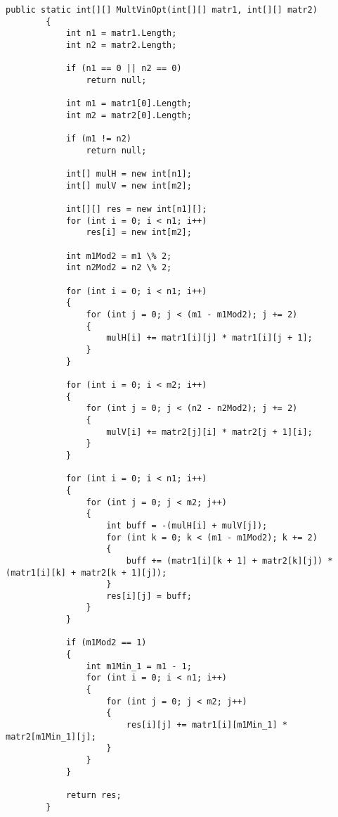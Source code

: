 \documentclass[12pt]{report}
\begin{document}
\begin{lstlisting}[label=some-code,caption=Оптимизированный алгоритм Винограда]
public static int[][] MultVinOpt(int[][] matr1, int[][] matr2)
        {
            int n1 = matr1.Length;
            int n2 = matr2.Length;

            if (n1 == 0 || n2 == 0)
                return null;

            int m1 = matr1[0].Length;
            int m2 = matr2[0].Length;

            if (m1 != n2)
                return null;

            int[] mulH = new int[n1];
            int[] mulV = new int[m2];

            int[][] res = new int[n1][];
            for (int i = 0; i < n1; i++)
                res[i] = new int[m2];

            int m1Mod2 = m1 \% 2;
            int n2Mod2 = n2 \% 2;

            for (int i = 0; i < n1; i++)
            {
                for (int j = 0; j < (m1 - m1Mod2); j += 2)
                {
                    mulH[i] += matr1[i][j] * matr1[i][j + 1];
                }
            }

            for (int i = 0; i < m2; i++)
            {
                for (int j = 0; j < (n2 - n2Mod2); j += 2)
                {
                    mulV[i] += matr2[j][i] * matr2[j + 1][i];
                }
            }

            for (int i = 0; i < n1; i++)
            {
                for (int j = 0; j < m2; j++)
                {
                    int buff = -(mulH[i] + mulV[j]);
                    for (int k = 0; k < (m1 - m1Mod2); k += 2)
                    {
                        buff += (matr1[i][k + 1] + matr2[k][j]) * (matr1[i][k] + matr2[k + 1][j]);
                    }
                    res[i][j] = buff;
                }
            }

            if (m1Mod2 == 1)
            {
                int m1Min_1 = m1 - 1;
                for (int i = 0; i < n1; i++)
                {
                    for (int j = 0; j < m2; j++)
                    {
                        res[i][j] += matr1[i][m1Min_1] * matr2[m1Min_1][j];
                    }
                }
            }
            
            return res;
        }
\end{lstlisting}
\end{document}
